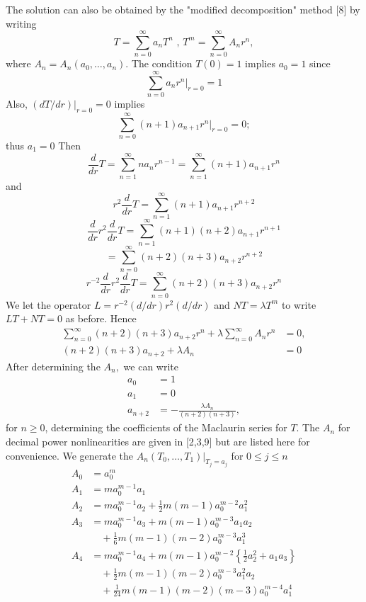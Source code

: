 \documentclass{GEM-JNL-FMP}
\theoremstyle{definition}
\numberwithin{equation}{section}
\begin{document}
The solution can also be obtained by the "modified decomposition" method [8] by writing
\begin{equation}
T=\sum_{n=0}^{\infty}a_{n}T^{n} \text{ , } T^{m}=\sum_{n=0}^{\infty}A_{n}r^{n},
\end{equation}
where $A_{n}=A_{n}(a_{0},\dots,a_{n}).$ The condition $T(0)=1$ implies $a_{0}=1$ since
$$ \sum_{n=0}^{\infty}a_{n}r^{n}\big|_{r=0}=1 $$
Also, $(dT/dr)|_{r=0}=0$ implies
$$ \sum_{n=0}^{\infty}(n+1)a_{n+1}r^{n}\big|_{r=0}=0; $$
thus $a_{1}=0$ Then
$$ \frac{d}{dr}T=\sum_{n=1}^{\infty}na_{n}r^{n-1}=\sum_{n=1}^{\infty}(n+1)a_{n+1}r^{n} $$
and
$$ r^{2}\frac{d}{dr}T=\sum_{n=1}^{\infty}(n+1)a_{n+1}r^{n+2} $$
$$ \frac{d}{dr}r^{2}\frac{d}{dr}T=\sum_{n=1}^{\infty}(n+1)(n+2)a_{n+1}r^{n+1} $$
$$ =\sum_{n=0}^{\infty}(n+2)(n+3)a_{n+2}r^{n+2} $$
$$ r^{-2}\frac{d}{dr}r^{2}\frac{d}{dr}T=\sum_{n=0}^{\infty}(n+2)(n+3)a_{n+2}r^{n} $$
We let the operator $L=r^{-2}(d/dr)r^{2}(d/dr)$ and $NT=\lambda T^{m}$ to write $LT+NT=0$ as before. Hence
\begin{align*}
\sum_{n=0}^{\infty}(n+2)(n+3)a_{n+2}r^{n}+\lambda\sum_{n=0}^{\infty}A_{n}r^{n}&=0, \\
(n+2)(n+3)a_{n+2}+\lambda A_{n}&=0
\end{align*}
After determining the $A_{n},$ we can write
\begin{align*}
a_{0}&=1 \\
a_{1}&=0 \\
a_{n+2}&=-\frac{\lambda A_{n}}{(n+2)(n+3)},
\end{align*}
for $n\ge0$, determining the coefficients of the Maclaurin series for $T$. The $A_{n}$ for decimal power nonlinearities are given in [2,3,9] but are listed here for convenience. We generate the $A_{n}(T_{0},\dots,T_{1})|_{T_{j}=a_{j}}$ for $0\le j \le n$
\begin{align*}
A_{0}&=a_{0}^{m} \\
A_{1}&=ma_{0}^{m-1}a_{1} \\
A_{2}&=ma_{0}^{m-1}a_{2}+\frac{1}{2}m(m-1)a_{0}^{m-2}a_{1}^{2} \\
A_{3}&=ma_{0}^{m-1}a_{3}+m(m-1)a_{0}^{m-3}a_{1}a_{2} \\
&\quad+\frac{1}{6}m(m-1)(m-2)a_{0}^{m-3}a_{1}^{3} \\
A_{4}&=ma_{0}^{m-1}a_{4}+m(m-1)a_{0}^{m-2}\left\{\frac{1}{2}a_{2}^{2}+a_{1}a_{3}\right\} \\
&\quad+\frac{1}{2}m(m-1)(m-2)a_{0}^{m-3}a_{1}^{2}a_{2} \\
&\quad+\frac{1}{24}m(m-1)(m-2)(m-3)a_{0}^{m-4}a_{1}^{4}
\end{align*}
\end{document}
